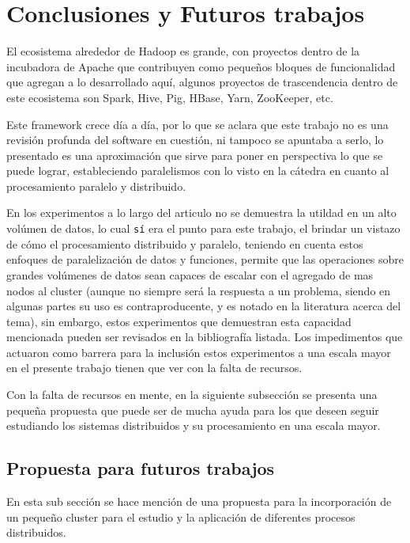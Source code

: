 \section{Conclusiones y Futuros trabajos}
\label{sec:conclusiones_y_futuros_trabajos}
El ecosistema alrededor de Hadoop es grande, con proyectos dentro de la
incubadora de Apache que contribuyen como pequeños bloques de funcionalidad que
agregan a lo desarrollado aquí, algunos proyectos de trascendencia dentro de este
ecosistema son Spark, Hive, Pig, HBase, Yarn, ZooKeeper, etc.

Este \gls{framework} crece día a día, por lo que se aclara que este trabajo no
es una revisión profunda del software en cuestión, ni tampoco se apuntaba a
serlo, lo presentado es una aproximación que sirve para
poner en perspectiva lo que se puede lograr, estableciendo paralelismos con lo
visto en la cátedra en cuanto al procesamiento paralelo y distribuido.

En los experimentos a lo largo del articulo no se demuestra la
utildad en un alto volúmen de datos, lo cual {\tt sí} era el punto para este
trabajo, el brindar un vistazo de cómo el procesamiento distribuido y paralelo,
teniendo en cuenta estos enfoques de paralelización de datos y funciones, 
permite que las operaciones sobre grandes volúmenes de datos sean capaces de 
escalar con el agregado de mas nodos al
\gls{cluster} (aunque no siempre será la respuesta a un problema, siendo en
algunas partes su uso es contraproducente, y es notado en la literatura acerca
del tema), sin embargo, estos experimentos que demuestran esta capacidad
mencionada pueden ser revisados en la bibliografía listada. Los
impedimentos que actuaron como barrera para la inclusión estos experimentos a 
una escala mayor en el presente trabajo tienen que ver con la falta de
recursos.

Con la falta de recursos en mente, en la siguiente subsección se presenta una
pequeña propuesta que puede ser de mucha ayuda para los que deseen seguir estudiando
los sistemas distribuidos y su procesamiento en una escala mayor.

\subsection{Propuesta para futuros trabajos}
\label{sec:propuesta}

En esta sub sección se hace mención de una propuesta para la incorporación de un
pequeño \gls{cluster} para el estudio y la aplicación de diferentes procesos
distribuidos.

